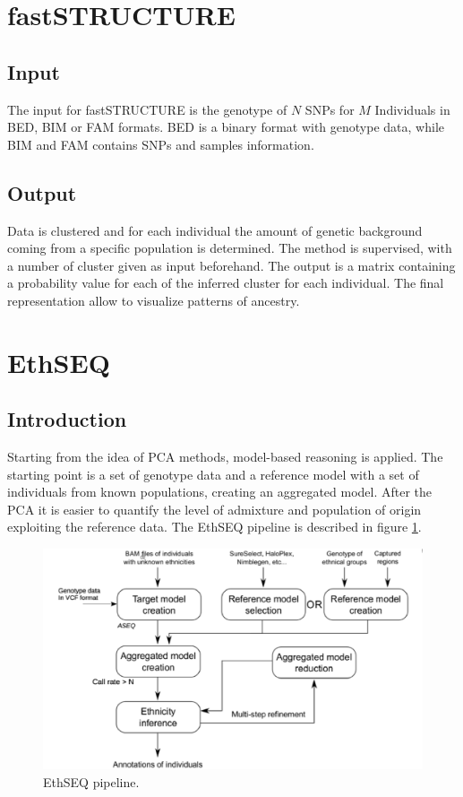 \section{fastSTRUCTURE}

	\subsection{Input}
	The input for fastSTRUCTURE is the genotype of $N$ SNPs for $M$ Individuals in BED, BIM or FAM formats.
	BED is a binary format with genotype data, while BIM and FAM contains SNPs and samples information.

	\subsection{Output}
	Data is clustered and for each individual the amount of genetic background coming from a specific population is determined.
	The method is supervised, with a number of cluster given as input beforehand.
	The output is a matrix containing a probability value for each of the inferred cluster for each individual.
	The final representation allow to visualize patterns of ancestry.

\section{EthSEQ}

	\subsection{Introduction}
	Starting from the idea of PCA methods, model-based reasoning is applied.
	The starting point is a set of genotype data and a reference model with a set of individuals from known populations, creating an aggregated model.
	After the PCA it is easier to quantify the level of admixture and population of origin exploiting the reference data.
	The EthSEQ pipeline is described in figure \ref{fig:ethseq}.

	\begin{figure}[H]
		\centering
		\includegraphics[width=\linewidth]{ethseq}
		\caption{EthSEQ pipeline.}
		\label{fig:ethseq}
	\end{figure}



